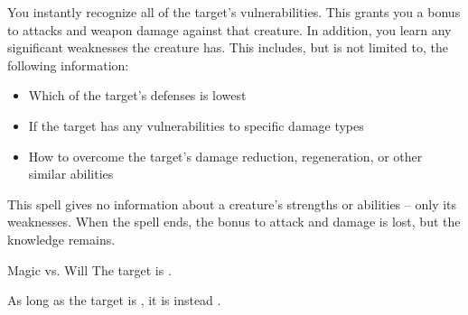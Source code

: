 \begin{spellheader}
    \spellrng{\rngmed}
    \spelldur{\durshort}
\end{spellheader}
\begin{spelleffects}
    \spelleffect You instantly recognize all of the target's vulnerabilities. This grants you a  bonus to attacks and weapon damage against that creature. In addition, you learn any significant weaknesses the creature has. This includes, but is not limited to, the following information:
    \begin{itemize}
        \item Which of the target's defenses is lowest
        \item If the target has any vulnerabilities to specific damage types
        \item How to overcome the target's damage reduction, regeneration, or other similar abilities
    \end{itemize}
\end{spelleffects}
\begin{spellfooter}
    \spellnotes This spell gives no information about a creature's strengths or abilities -- only its weaknesses. When the spell ends, the bonus to attack and damage is lost, but the knowledge remains.
\end{spellfooter}

\begin{spellheader}
\end{spellheader}
\begin{spelleffects}
    \begin{spellattack}{Magic vs. Will}
        \spellsuccess The target is \bewildered.

        As long as the target is \bloodied, it is instead \confused.
    \end{spellattack}
\end{spelleffects}
\begin{spellfooter}

\end{spellfooter}

